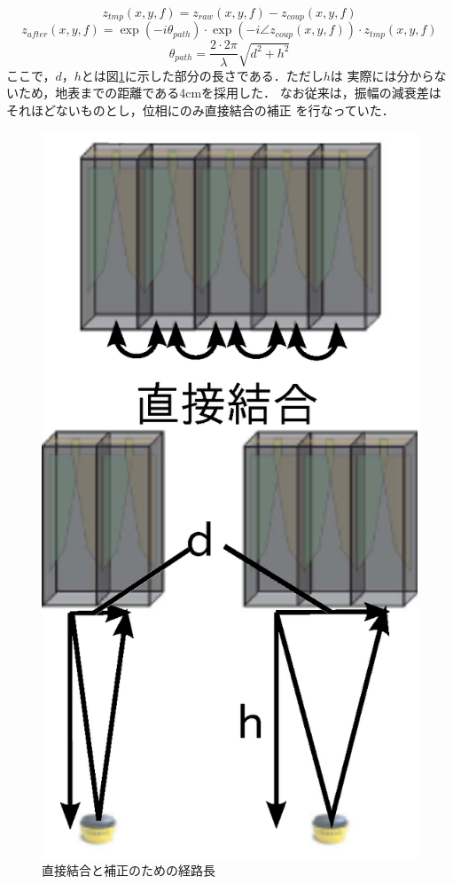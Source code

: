 ﻿\documentclass[12pt,oneside]{jsbook}
\begin{document}
\begin{equation}
 z_{tmp}(x,y,f)=z_{raw}(x,y,f)-z_{coup}(x,y,f)
\end{equation}
\begin{equation}
 z_{after}(x,y,f)=\exp(-i\theta_{path})\cdot\exp(-i\angle z_{coup}(x,y,f))\cdot z_{tmp}(x,y,f)
\end{equation}
\begin{equation}
 \theta_{path}=\frac{2\cdot2\pi}{\lambda} \sqrt{d^2+h^2}
\end{equation}
ここで，$d$，$h$とは図\ref{dc}に示した部分の長さである．ただし$h$は
実際には分からないため，地表までの距離である4cmを採用した．
なお従来は，振幅の減衰差はそれほどないものとし，位相にのみ直接結合の補正
を行なっていた．
\begin{figure}[btp]
\begin{center}
\includegraphics[width =0.5\hsize ]{directcoup.eps}
\caption{直接結合と補正のための経路長}
\label{dc}  
\end{center}    
\end{figure}
\end{document}
